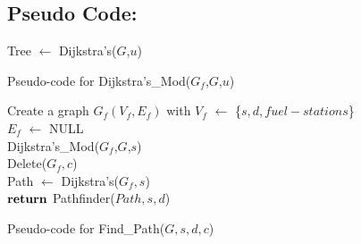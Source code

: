 \documentclass[pdftex,a4paper,12pt]{report}
\begin{document}
\subsection{Pseudo Code:}
\begin{algorithm}
        Tree $\gets$ Dijkstra's($G$,$u$)\\
         {
        }
        \caption{Pseudo-code for Dijkstra's\_Mod($G_{f}$,$G$,$u$)}
\end{algorithm}

\begin{algorithm}
        Create a graph $G_{f}(V_{f},E_{f})$ with $V_{f}$ $\gets$ \{$s,d,fuel-stations$\}\\
        $E_{f}$ $\gets$ NULL\\
       Dijkstra's\_Mod($G_{f}$,$G$,$s$)\\
       Delete($G_{f},c$)\\
       Path $\gets$ Dijkstra's($G_{f},s$)\\
       $\Return$ Pathfinder($Path,s,d$)
    \caption{Pseudo-code for Find\_Path($G,s,d,c$)}
\end{algorithm}

        
\end{document}
